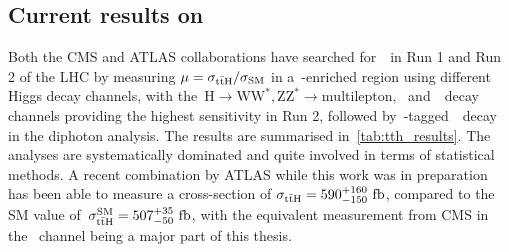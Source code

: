 \subsection{Current results on~\ttH}
Both the CMS and ATLAS collaborations have searched for~\ttH~in Run 1 and Run 2 of the LHC by measuring $\mu = \sigma_{\mathrm{t} \bar{\mathrm{t}} \mathrm{H}} / \sigma_{\mathrm{SM}}$ in a~\ttH-enriched region using different Higgs decay channels, with the~$\mathrm{H} \rightarrow \mathrm{WW^*},\mathrm{ZZ^*} \rightarrow \mathrm{multilepton}$, \Hbb~and~\Htautau~decay channels providing the highest sensitivity in Run 2, followed by~\ttH-tagged~\Hgg~decay in the diphoton analysis. The results are summarised in~\cref{tab:tth_results}. The analyses are systematically dominated and quite involved in terms of statistical methods. A recent combination by ATLAS while this work was in preparation has been able to measure a cross-section of $\sigma_{\mathrm{t} \bar{\mathrm{t}} \mathrm{H}} = 590^{+160}_{-150}~\mathrm{fb}$, compared to the SM value of~$\sigma_{\mathrm{t} \bar{\mathrm{t}} \mathrm{H}}^{\mathrm{SM}} = 507^{+35}_{-50}~\mathrm{fb}$, with the equivalent measurement from CMS in the \Hbb~channel being a major part of this thesis.

